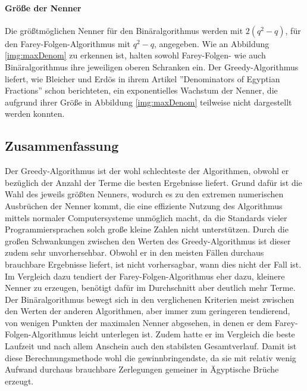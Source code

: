 \paragraph{Größe der Nenner}Die größtmöglichen Nenner für den Binäralgorithmus werden mit $2(q^2-q)$, für den Farey-Folgen-Algorithmus mit $q^2-q$, angegeben. Wie an Abbildung \ref{img:maxDenom} zu erkennen ist, halten sowohl Farey-Folgen- wie auch Binäralgorithmus ihre jeweiligen oberen Schranken ein.
Der Greedy-Algorithmus liefert, wie Bleicher und Erdös in ihrem Artikel ''Denominators of Egyptian Fractions'' \cite[S. 157]{BleicherErdoes1976} schon berichteten, ein exponentielles Wachstum der Nenner, die aufgrund ihrer Größe in Abbildung \ref{img:maxDenom} teilweise nicht dargestellt werden konnten.

\subsection{Zusammenfassung}
Der Greedy-Algorithmus ist der wohl schlechteste der Algorithmen, obwohl er bezüglich der Anzahl der Terme die besten Ergebnisse liefert. Grund dafür ist die Wahl des jeweils größten Nenners, wodurch es zu den extremen numerischen Ausbrüchen der Nenner kommt, die eine effiziente Nutzung des Algorithmus mittels normaler Computersysteme unmöglich macht, da die Standards vieler Programmiersprachen solch große \bzw kleine Zahlen nicht unterstützen. Durch die großen Schwankungen zwischen den Werten des Greedy-Algorithmus ist dieser zudem sehr unvorhersehbar. Obwohl er in den meisten Fällen durchaus brauchbare Ergebnisse liefert, ist nicht vorhersagbar, wann dies nicht der Fall ist. Im Vergleich dazu tendiert der Farey-Folgen-Algorithmus eher dazu, kleinere Nenner zu erzeugen, benötigt dafür im Durchschnitt aber deutlich mehr Terme. Der Binäralgorithmus bewegt sich in den verglichenen Kriterien meist zwischen den Werten der anderen Algorithmen, aber immer zum geringeren tendierend, von wenigen Punkten der maximalen Nenner abgesehen, in denen er dem Farey-Folgen-Algorithmus leicht unterlegen ist. Zudem hatte er im Vergleich die beste Laufzeit und nach allem Anschein auch den stabilsten Gesamtverlauf. Damit ist diese Berechnungsmethode wohl die gewinnbringendste, da sie mit relativ wenig Aufwand durchaus brauchbare Zerlegungen gemeiner in Ägyptische Brüche erzeugt.